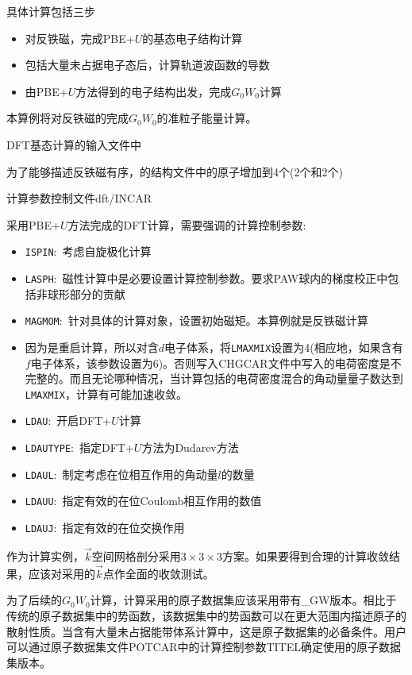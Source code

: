 具体计算包括三步
\begin{itemize}
	\item 对反铁磁，完成\textrm{PBE+}$U$的基态电子结构计算
	\item 包括大量未占据电子态后，计算轨道波函数的导数
	\item 由\textrm{PBE+}$U$方法得到的电子结构出发，完成$G_0W_0$计算
\end{itemize}
本算例将对反铁磁的完成$G_0W_0$的准粒子能量计算。

\textrm{DFT}基态计算的输入文件中

为了能够描述反铁磁有序，的结构文件中的原子增加到4个(2个和2个)

计算参数控制文件\textrm{dft/INCAR}

采用\textrm{PBE+}$U$方法完成的\textrm{DFT}计算，需要强调的计算控制参数:
\begin{itemize}
	\item \texttt{ISPIN}:~考虑自旋极化计算
	\item \texttt{LASPH}:~磁性计算中是必要设置计算控制参数。要求\textrm{PAW}球内的梯度校正中包括非球形部分的贡献
	\item \texttt{MAGMOM}:~针对具体的计算对象，设置初始磁矩。本算例就是反铁磁计算
	\item 因为是重启计算，所以对含$d$电子体系，将\texttt{LMAXMIX}设置为4(相应地，如果含有$f$电子体系，该参数设置为6)。否则写入\textrm{CHGCAR}文件中写入的电荷密度是不完整的。而且无论哪种情况，当计算包括的电荷密度混合的角动量量子数达到\texttt{LMAXMIX}，计算有可能加速收敛。
	\item \texttt{LDAU}:~开启\textrm{DFT+}$U$计算
	\item \texttt{LDAUTYPE}:~指定\textrm{DFT+}$U$方法为\textrm{Dudarev}方法
	\item \texttt{LDAUL}:~制定考虑在位相互作用的角动量$l$的数量
	\item \texttt{LDAUU}:~指定有效的在位\textrm{Coulomb}相互作用的数值
	\item \texttt{LDAUJ}:~指定有效的在位交换作用
\end{itemize}

作为计算实例，$\vec k$空间网格剖分采用$3\times3\times3$方案。如果要得到合理的计算收敛结果，应该对采用的$\vec k$点作全面的收敛测试。

为了后续的$G_0W_0$计算，计算采用的原子数据集应该采用带有\textrm{\_GW}版本。相比于传统的原子数据集中的势函数，该数据集中的势函数可以在更大范围内描述原子的散射性质。当含有大量未占据能带体系计算中，这是原子数据集的必备条件。用户可以通过原子数据集文件\textrm{POTCAR}中的计算控制参数\textrm{TITEL}确定使用的原子数据集版本。


